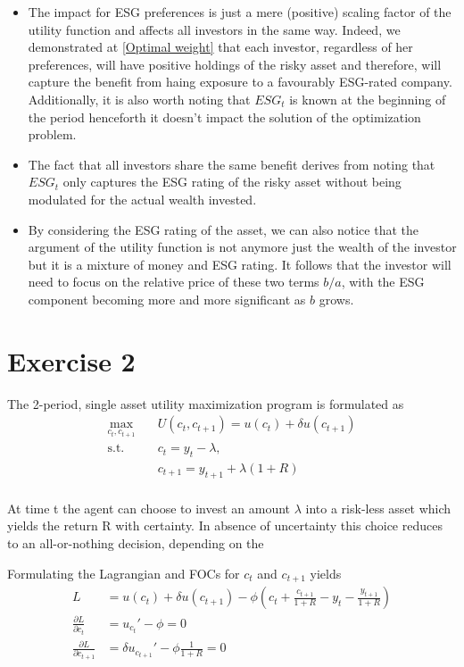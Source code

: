 \documentclass[12pt]{article}
\begin{document}
	\begin{itemize}
		\item The impact for ESG preferences is just a mere (positive) scaling factor of the utility function and affects all investors in the same way. Indeed, we demonstrated at \ref{Optimal weight} that each investor, regardless of her preferences, will have positive holdings of the risky asset and therefore, will capture the benefit from haing exposure to a favourably ESG-rated company. Additionally, it is also worth noting that $ESG_t$ is known at the beginning of the period  henceforth it doesn't impact the solution of the optimization problem.   
		\item The fact that all investors share the same benefit derives from noting that $ESG_t$ only captures the ESG rating of the risky asset without being modulated for the actual wealth invested.
		\item By considering the ESG rating of the asset, we can also notice that the argument of the utility function is not anymore just the wealth of the investor but it is a mixture of money and ESG rating. It follows that the investor will need to focus on the relative price of these two terms $b/a$, with the ESG component becoming more and more significant as $b$ grows. 
	\end{itemize}
	
	\section{Exercise 2}
	The 2-period, single asset utility maximization program is formulated as
	\begin{align*}
		\max_{c_t, c_{t+1}} \quad & U(c_t, c_{t+1}) = u(c_t) + \delta u(c_{t+1}) \\
		\textrm{s.t.} \quad & c_t = y_t - \lambda,\\
		\quad & c_{t+1} = y_{t+1} + \lambda (1+R)\\
	\end{align*}
	
	At time t the agent can choose to invest an amount $\lambda$ into a risk-less asset which yields the return R with certainty. In absence of uncertainty this choice reduces to an all-or-nothing decision, depending on the 
	
	Formulating the Lagrangian and FOCs for $c_t$ and $c_{t+1}$ yields
	\begin{align*}
		L &= u(c_t) + \delta u(c_{t+1}) - \phi \left(c_t + \frac{c_{t+1}}{1+R} - y_t - \frac{y_{t+1}}{1+R}\right)\\
		\frac{\partial L}{\partial c_t} &= u_{c_t}' - \phi = 0\\
		\frac{\partial L}{\partial c_{t+1}} &= \delta u_{c_{t+1}}' - \phi \frac{1}{1+R}= 0
	\end{align*}
	
\end{document}
